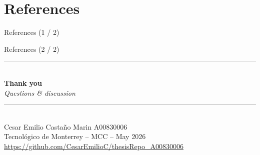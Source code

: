 
\section{References}


\begin{frame}{References (1 / 2)}
\scriptsize
\setlength{\bibitemsep}{5pt}
\setlength{\bibhang}{8pt}
\printbibliography[heading=none, keyword=half1]
\end{frame}

\begin{frame}{References (2 / 2)}
\scriptsize
\setlength{\bibitemsep}{5pt}
\setlength{\bibhang}{8pt}
\printbibliography[heading=none, keyword=half2]
\end{frame}

\begin{frame}[plain]
\centering
\vspace{0.8cm}
{\color{tecblue}\rule{0.7\linewidth}{1.2pt}}\\[14pt]
{\Huge\bfseries\color{tecdark}Thank you}\\[10pt]
{\large\color{slidegray}\itshape Questions \& discussion}\\[14pt]
{\color{tecblue}\rule{0.7\linewidth}{1.2pt}}\\[20pt]
{\small Cesar Emilio Casta\~no Marin \quad A00830006}\\
{\scriptsize Tecnol\'ogico de Monterrey -- MCC -- May 2026}\\[8pt]
{\scriptsize\url{https://github.com/CesarEmilioC/thesisRepo_A00830006}}
\end{frame}

